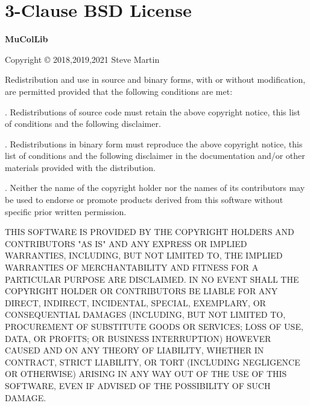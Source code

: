 \chapter*{3-Clause BSD License}
{}
\begin{center}
{\bf\large MuColLib}

Copyright \copyright{} 2018,2019,2021 Steve Martin
\end{center}

Redistribution and use in source and binary forms, with or without modification, are permitted provided that the following conditions are met:

. Redistributions of source code must retain the above copyright notice, this list of conditions and the following disclaimer.

. Redistributions in binary form must reproduce the above copyright notice, this list of conditions and the following disclaimer in the documentation and/or other materials provided with the distribution.

. Neither the name of the copyright holder nor the names of its contributors may be used to endorse or promote products derived from this software without specific prior written permission.

\bigskip
\begin{flushleft}
THIS SOFTWARE IS PROVIDED BY THE COPYRIGHT HOLDERS AND CONTRIBUTORS "AS IS" AND ANY EXPRESS OR IMPLIED WARRANTIES, INCLUDING, BUT NOT LIMITED TO, THE IMPLIED WARRANTIES OF MERCHANTABILITY AND FITNESS FOR A PARTICULAR PURPOSE ARE DISCLAIMED. IN NO EVENT SHALL THE COPYRIGHT HOLDER OR CONTRIBUTORS BE LIABLE FOR ANY DIRECT, INDIRECT, INCIDENTAL, SPECIAL, EXEMPLARY, OR CONSEQUENTIAL DAMAGES (INCLUDING, BUT NOT LIMITED TO, PROCUREMENT OF SUBSTITUTE GOODS OR SERVICES; LOSS OF USE, DATA, OR PROFITS; OR BUSINESS INTERRUPTION) HOWEVER CAUSED AND ON ANY THEORY OF LIABILITY, WHETHER IN CONTRACT, STRICT LIABILITY, OR TORT (INCLUDING NEGLIGENCE OR OTHERWISE) ARISING IN ANY WAY OUT OF THE USE OF THIS SOFTWARE, EVEN IF ADVISED OF THE POSSIBILITY OF SUCH DAMAGE.
\end{flushleft}
